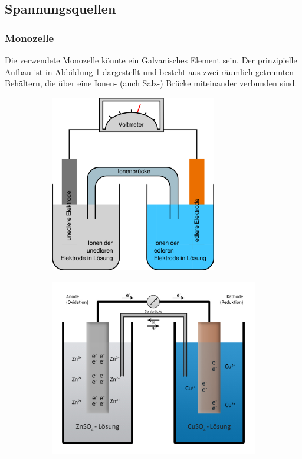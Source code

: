 \subsection{Spannungsquellen}
\subsubsection{Monozelle}
Die verwendete Monozelle könnte ein Galvanisches Element sein. Der prinzipielle Aufbau ist in Abbildung \ref{Galvanisches_Element} dargestellt und besteht aus zwei räumlich getrennten Behältern, die über eine Ionen- (auch Salz-) Brücke miteinander verbunden sind.
\begin{figure}[h!]
	\begin{subfigure}{0.5\textwidth}
		\centering
		\includegraphics[width=0.8\textwidth]{Galvanische_Zelle.pdf}
		\label{Galvanisches_Element}
	\end{subfigure}
	\begin{subfigure}{0.5\textwidth}
		\centering
		\includegraphics[width=\textwidth]{Daniell-Element.jpg}
		\label{Daniell_Element}
	\end{subfigure}
\end{figure}
